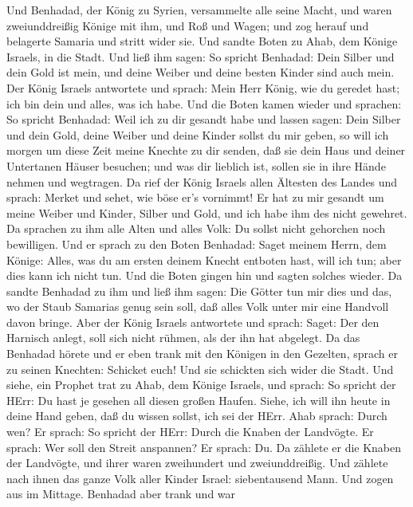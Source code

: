  Und Benhadad, der König zu Syrien, versammelte alle seine
Macht, und waren zweiunddreißig Könige mit ihm, und Roß und Wagen; und
zog herauf und belagerte Samaria und stritt wider sie.  Und
sandte Boten zu Ahab, dem Könige Israels, in die Stadt.  Und
ließ ihm sagen: So spricht Benhadad: Dein Silber und dein Gold ist mein,
und deine Weiber und deine besten Kinder sind auch mein. 
Der König Israels antwortete und sprach: Mein Herr König, wie du geredet
hast; ich bin dein und alles, was ich habe.  Und die Boten
kamen wieder und sprachen: So spricht Benhadad: Weil ich zu dir gesandt
habe und lassen sagen: Dein Silber und dein Gold, deine Weiber und deine
Kinder sollst du mir geben,  so will ich morgen um diese
Zeit meine Knechte zu dir senden, daß sie dein Haus und deiner
Untertanen Häuser besuchen; und was dir lieblich ist, sollen sie in ihre
Hände nehmen und wegtragen.  Da rief der König Israels allen
Ältesten des Landes und sprach: Merket und sehet, wie böse er's
vornimmt! Er hat zu mir gesandt um meine Weiber und Kinder, Silber und
Gold, und ich habe ihm des nicht gewehret.  Da sprachen zu
ihm alle Alten und alles Volk: Du sollst nicht gehorchen noch
bewilligen.  Und er sprach zu den Boten Benhadad: Saget
meinem Herrn, dem Könige: Alles, was du am ersten deinem Knecht entboten
hast, will ich tun; aber dies kann ich nicht tun. Und die Boten gingen
hin und sagten solches wieder.  Da sandte Benhadad zu ihm
und ließ ihm sagen: Die Götter tun mir dies und das, wo der Staub
Samarias genug sein soll, daß alles Volk unter mir eine Handvoll davon
bringe.  Aber der König Israels antwortete und sprach:
Saget: Der den Harnisch anlegt, soll sich nicht rühmen, als der ihn hat
abgelegt.  Da das Benhadad hörete und er eben trank mit den
Königen in den Gezelten, sprach er zu seinen Knechten: Schicket euch!
Und sie schickten sich wider die Stadt.  Und siehe, ein
Prophet trat zu Ahab, dem Könige Israels, und sprach: So spricht der
HErr: Du hast je gesehen all diesen großen Haufen. Siehe, ich will ihn
heute in deine Hand geben, daß du wissen sollst, ich sei der HErr.
 Ahab sprach: Durch wen? Er sprach: So spricht der HErr:
Durch die Knaben der Landvögte. Er sprach: Wer soll den Streit
anspannen? Er sprach: Du.  Da zählete er die Knaben der
Landvögte, und ihrer waren zweihundert und zweiunddreißig. Und zählete
nach ihnen das ganze Volk aller Kinder Israel: siebentausend Mann.
 Und zogen aus im Mittage. Benhadad aber trank und war
